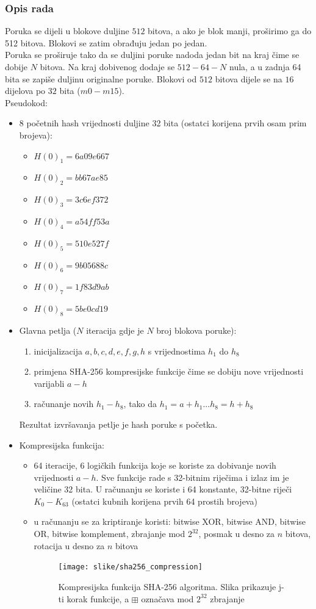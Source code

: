 \documentclass[12pt]{article}
\begin{document}
\subsubsection{Opis rada}
Poruka se dijeli u blokove duljine $512$ bitova, a ako je blok manji, proširimo ga do 512 bitova. Blokovi se zatim obrađuju jedan po jedan.\\
Poruka se proširuje tako da se duljini poruke  nadoda jedan bit na kraj čime se dobije $N$ bitova. Na kraj dobivenog dodaje se $512 - 64 - N$ nula, a u zadnja 64 bita se zapiše duljinu originalne poruke.
Blokovi od $512$ bitova dijele se na $16$ dijelova po $32$ bita ($m0 - m15$).\\

Pseudokod:
\begin{itemize}
	\item 8 početnih hash vrijednosti duljine 32 bita (ostatci korijena prvih osam prim brojeva):
	\begin{itemize}
		\item $H(0)_1 = 6a09e667$
		\item $H(0)_2 = bb67ae85$
		\item $H(0)_3 = 3c6ef372$
		\item $H(0)_4 = a54ff53a$
		\item $H(0)_5 = 510e527f$
		\item $H(0)_6 = 9b05688c$
		\item $H(0)_7 = 1f83d9ab$
		\item $H(0)_8 = 5be0cd19$
	\end{itemize}
	\item Glavna petlja ($N$ iteracija gdje je $N$ broj blokova poruke):
	\begin{enumerate}
		\item inicijalizacija $a, b, c, d, e, f, g, h$ s vrijednostima $h_1$ do $h_8$
		\item primjena SHA-256 kompresijske funkcije čime se dobiju nove vrijednosti varijabli $a - h$
		\item računanje novih $h_1 - h_8$, tako da $h_1 = a + h_1 . . . h_8 = h + h_8$
	\end{enumerate}
	Rezultat izvršavanja petlje je hash poruke s početka.
	\item Kompresijska funkcija:
	\begin{itemize}
		\item 64 iteracije, 6 logičkih funkcija koje se koriste za dobivanje novih vrijednosti $a - h$. Sve funkcije rade s 32-bitnim riječima i izlaz im je veličine 32 bita. U računanju se koriste i 64 konstante, 32-bitne riječi $K_0-K_{63}$ (ostatci kubnih korijena prvih 64 prostih brojeva)
		\item u računanju se za kriptiranje koristi: bitwise XOR, bitwise AND, bitwise OR, bitwise komplement, zbrajanje mod $2^{32}$, posmak u desno za $n$ bitova, rotacija u desno za $n$ bitova\cite{sha-description}
		\begin{figure}[h!]
			\centering
			\texttt{[image: slike/sha256\_compression]}
			\caption{Kompresijska funkcija SHA-256 algoritma. Slika prikazuje j-ti korak funkcije, a $\boxplus$ označava mod $2^{32}$ zbrajanje}
		\end{figure}
	\end{itemize}
\end{itemize}
\end{document}
